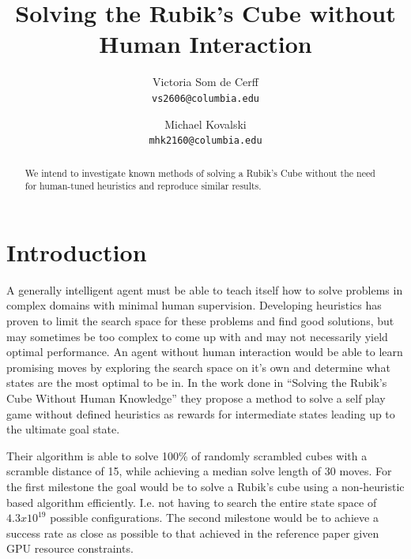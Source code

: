 \documentclass[10pt,twocolumn,letterpaper]{article}
\begin{document}
\title{Solving the Rubik's Cube without Human Interaction}

\author{Victoria Som de Cerff\\
{\tt\small vs2606@columbia.edu}
\and
Michael Kovalski\\
{\tt\small mhk2160@columbia.edu}
}

\maketitle

\begin{abstract}
We intend to investigate known methods of solving a Rubik's Cube without the need for human-tuned heuristics and reproduce similar results. 
\end{abstract}

\section{Introduction}

A generally intelligent agent must be able to teach itself how to solve problems in complex domains with minimal human supervision.  Developing heuristics has proven to limit the search space for these problems and find good solutions, but may sometimes be too complex to come up with and may not necessarily yield optimal performance. An agent without human interaction would be able to learn promising moves by exploring the search space on it’s own and determine what states are the most optimal to be in. In the work done in “Solving the Rubik’s Cube Without Human Knowledge” they propose a method to solve a self play game without defined heuristics as rewards for intermediate states leading up to the ultimate goal state.  

Their algorithm is able to solve 100\% of randomly scrambled cubes with a scramble distance of 15, while achieving a median solve length of 30 moves.  For the first milestone the goal would be to solve a Rubik’s cube using a non-heuristic based algorithm efficiently.  I.e. not having to search the entire state space of $4.3 x 10^{19}$ possible configurations.  The second milestone would be to achieve a success rate as close as possible to that achieved in the reference paper given GPU resource constraints. 
\end{document}
